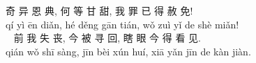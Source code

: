 奇 异 恩 典, 何 等 甘 甜,
我 罪 已 得 赦 免!  \\
qí yì ēn diǎn, hé děng gān tián,
wǒ zuì yǐ de shè miǎn!  \\
 
前 我 失 丧, 今 被 寻 回,
瞎 眼 今 得 看 见.  \\
qián wǒ shī sàng, jīn bèi xún huí,
xiā yǎn jīn de kàn jiàn.\\
